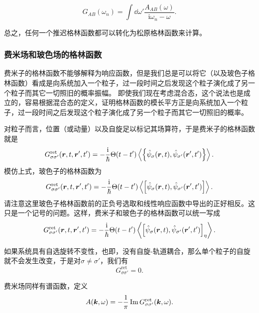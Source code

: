 \documentclass[hyperref, UTF8, a4paper]{ctexart}
\newcommand*{\ii}{\mathrm{i}}
\begin{document}
\begin{equation}
    G_{AB} (\omega_n) = \int \dd{\omega'} \frac{A_{AB}(\omega)}{\ii \omega_n - \omega}.
\end{equation}

总之，任何一个推迟格林函数都可以转化为松原格林函数来计算。

\subsubsection{费米场和玻色场的格林函数}

费米子的格林函数不能够解释为响应函数，但是我们总是可以将它（以及玻色子格林函数）看成是向系统加入一个粒子，过一段时间之后发现这个粒子演化成了另一个粒子而其它一切照旧的概率振幅。
即使我们现在考虑混合态，这个说法也是成立的，容易根据混合态的定义，证明格林函数的模长平方正是向系统加入一个粒子，过一段时间之后发现这个粒子演化成了另一个粒子而其它一切照旧的概率。

对粒子而言，位置（或动量）以及自旋足以标记其场算符，于是费米子的格林函数就是
\begin{equation}
    G^\text{ret}_{\sigma \sigma'}(\vb*{r}, t, \vb*{r}', t') = - \frac{\ii}{\hbar} \Theta(t-t') \expval{\acomm{\hat{\psi}_\sigma (\vb*{r}, t)}{\hat{\psi}_{\sigma'}(\vb*{r}', t')}}.
\end{equation}
模仿上式，玻色子的格林函数为
\begin{equation}
    G^\text{ret}_{\sigma \sigma'}(\vb*{r}, t, \vb*{r}', t') = - \frac{\ii}{\hbar} \Theta(t-t') \expval{\comm{\hat{\psi}_\sigma (\vb*{r}, t)}{\hat{\psi}_{\sigma'}(\vb*{r}', t')}}.
\end{equation}
请注意这里玻色子格林函数前的正负号选取和线性响应函数中导出的正好相反。这只是一个记号的问题。这样，费米子和玻色子的格林函数可以统一写成
\begin{equation}
    G^\text{ret}_{\sigma \sigma'}(\vb*{r}, t, \vb*{r}', t') = - \frac{\ii}{\hbar} \Theta(t-t') \expval{\comm{\hat{\psi}_\sigma (\vb*{r}, t)}{\hat{\psi}_{\sigma'}(\vb*{r}', t')}_\eta}.
\end{equation}

如果系统具有自选旋转不变性，也即，没有自旋-轨道耦合，那么单个粒子的自旋就不会发生改变，于是对$\sigma \neq \sigma'$，我们有%
\[
    G^\text{ret}_{\sigma \sigma'} = 0.
\]

费米场同样有谱函数，定义
\begin{equation}
    A(\vb*{k}, \omega) = - \frac{1}{\pi} \Im G^\text{ret}_{\sigma \sigma'}(\vb*{k}, \omega).
\end{equation}
\end{document}
